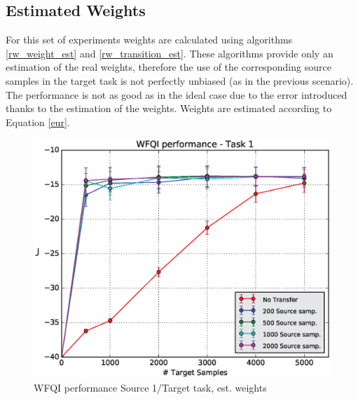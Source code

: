     \subsection{Estimated Weights}

    \noindent For this set of experiments weights are calculated
    using algorithms \ref{rw_weight_est} and \ref{rw_transition_est}. These algorithms provide only an
    estimation of the real weights, therefore the use of the corresponding source samples in the target
    task is not perfectly unbiased (as in the previous scenario). The performance is not as good as
    in the ideal case due to the error introduced thanks to the estimation of the weights.
    Weights are estimated according to Equation \ref{eur}.

    \begin{figure}[H]
      \raggedbottom
      \centering
      \includegraphics[scale=0.5]{images/WFQIPerf1_V2.eps}
      \caption{WFQI performance Source 1/Target task, est. weights}
      \label{perf1V2}
    \end{figure}

